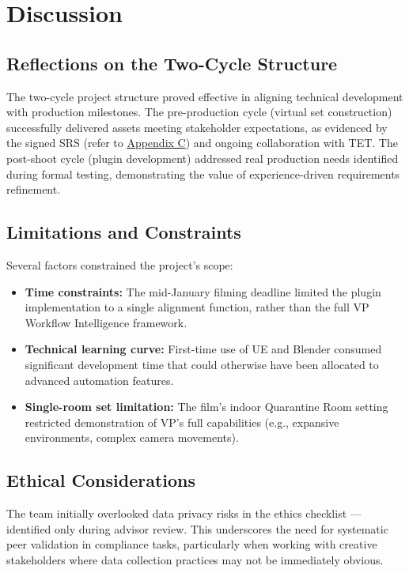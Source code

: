 \documentclass[12pt,a4paper]{report}
\begin{document}
\section{Discussion}

\subsection{Reflections on the Two-Cycle Structure}
The two-cycle project structure proved effective in aligning technical development with production milestones. The pre-production cycle (virtual set construction) successfully delivered assets meeting stakeholder expectations, as evidenced by the signed SRS (refer to \hyperref[app:SRS_signed]{Appendix C}) and ongoing collaboration with TET. The post-shoot cycle (plugin development) addressed real production needs identified during formal testing, demonstrating the value of experience-driven requirements refinement.

\subsection{Limitations and Constraints}
Several factors constrained the project's scope:
\begin{itemize}
    \item \textbf{Time constraints:} The mid-January filming deadline limited the plugin implementation to a single alignment function, rather than the full VP Workflow Intelligence framework.
    \item \textbf{Technical learning curve:} First-time use of UE and Blender consumed significant development time that could otherwise have been allocated to advanced automation features.
    \item \textbf{Single-room set limitation:} The film's indoor Quarantine Room setting restricted demonstration of VP's full capabilities (e.g., expansive environments, complex camera movements).
\end{itemize}

\subsection{Ethical Considerations}
The team initially overlooked data privacy risks in the ethics checklist — identified only during advisor review. This underscores the need for systematic peer validation in compliance tasks, particularly when working with creative stakeholders where data collection practices may not be immediately obvious.
\end{document}
